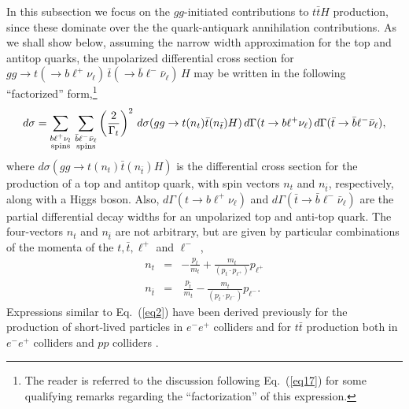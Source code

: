 \documentclass[aps,preprint,tightenlines,floatfix,superscriptaddress,nofootinbib,showpacs]{revtex4-1}
\def\beq{\begin{equation}}
\def\eeq{\end{equation}}
\def\bea{\begin{eqnarray}}
\def\eea{\end{eqnarray}}
\def\tbar{\bar{t}}
\def\bbar{\bar{b}}
\def\nubar{{\bar{\nu}}_{\ell}}
\begin{document}
In this subsection we focus on the $gg$-initiated
contributions
to $t\tbar H$ production, since these dominate over the
the quark-antiquark annihilation contributions. As we shall show below, assuming the
narrow width approximation for the top and antitop quarks, the unpolarized
differential cross section for $gg\to t(\to
b{\ell}^+\nu_{\ell})\,\tbar(\to \bbar {\ell}^- \nubar)\,H$ may be
written in the following ``factorized'' form,\footnote{The reader
  is referred to the discussion following Eq.~(\ref{eq17}) for some qualifying
  remarks regarding the ``factorization'' of this expression.}
%
\beq
\label{eq2}
d\sigma =\sum_{\substack{b{\ell}^+\nu_l \\ \tiny{\mathrm{spins}}}}\,
   \sum_{\substack{\bbar {\ell}^-\nubar \\ \mathrm{\tiny{spins}}}}\left(\frac{2}{\Gamma_t}\right)^2\,
   d\sigma(gg\to t(n_t)\tbar (n_{\tbar})H)\,
   d\Gamma(t\to b{\ell}^+\nu_{\ell})\,
   d\Gamma(\tbar \to \bbar {\ell}^-\nubar),
\eeq  
%
where $d\sigma(gg\to t(n_t)\tbar (n_{\tbar})H)$ is the differential
cross section for the production of a top and antitop quark,
with spin vectors $n_t$ and $n_{\bar{t}}$, respectively, along with a Higgs
boson.  Also, $d\Gamma(t\to b{\ell}^+\nu_{\ell})$ and
$d\Gamma(\tbar \to \bbar {\ell}^-\nubar)$ are the
partial differential decay widths for an unpolarized top and
anti-top quark.  The four-vectors
$n_t$ and $n_{\tbar}$ are not arbitrary, but are
given by particular combinations of the
momenta of the $t,\tbar, \ell^+$ and $\ell^-$~\cite{Arens},
%
\bea
\label{eq3}
n_t&=&-\frac{p_t}{m_t}+\frac{m_t}{(p_t\cdot p_{{\ell}^+})}p_{{\ell}^+}\\
\label{eq4}
n_{\tbar}&=&\,\frac{p_{\tbar}}{m_t}-\frac{m_t}{(p_{\tbar}\cdot p_{{\ell}^-})}p_{{\ell}^-}.
\eea
%
Expressions similar to Eq.~(\ref{eq2}) have been derived previously for the
production of short-lived particles in $e^-e^+$ colliders
\cite{kawasaki} and for $t\tbar$ production both in
$e^-e^+$ colliders \cite{Arens} and $pp$ colliders
\cite{ale1,*ale2,*ale3,*ale4}. \par
\end{document}
